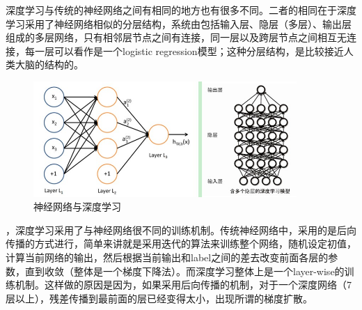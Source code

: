 \documentclass[UTF8]{ctexart}
\begin{document}
\par 深度学习与传统的神经网络之间有相同的地方也有很多不同。二者的相同在于深度学习采用了神经网络相似的分层结构，系统由包括输入层、隐层（多层）、输出层组成的多层网络，只有相邻层节点之间有连接，同一层以及跨层节点之间相互无连接，每一层可以看作是一个logistic regression模型；这种分层结构，是比较接近人类大脑的结构的。
\begin{figure}[h!]
    \centering
    \includegraphics[width=10cm]{0507-3.jpg}
    \caption{神经网络与深度学习}
    \label{fig-sample}
\end{figure}
，深度学习采用了与神经网络很不同的训练机制。传统神经网络中，采用的是后向传播的方式进行，简单来讲就是采用迭代的算法来训练整个网络，随机设定初值，计算当前网络的输出，然后根据当前输出和label之间的差去改变前面各层的参数，直到收敛（整体是一个梯度下降法）。而深度学习整体上是一个layer-wise的训练机制。这样做的原因是因为，如果采用后向传播的机制，对于一个深度网络（7层以上），残差传播到最前面的层已经变得太小，出现所谓的梯度扩散。
\end{document}
